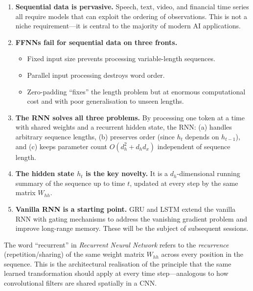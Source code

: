 \documentclass[12pt,a4paper]{article}
\newcommand{\Whh}{W_{hh}}
\begin{document}
\begin{enumerate}[leftmargin=2em,label=\textbf{\arabic*.}]
  \item \textbf{Sequential data is pervasive.} Speech, text, video, and
        financial time series all require models that can exploit the ordering
        of observations.  This is not a niche requirement---it is central to
        the majority of modern AI applications.

  \item \textbf{FFNNs fail for sequential data on three fronts.}
        \begin{itemize}[nosep]
          \item Fixed input size prevents processing variable-length sequences.
          \item Parallel input processing destroys word order.
          \item Zero-padding ``fixes'' the length problem but at enormous
                computational cost and with poor generalisation to unseen lengths.
        \end{itemize}

  \item \textbf{The RNN solves all three problems.}  By processing one token
        at a time with shared weights and a recurrent hidden state, the RNN:
        (a) handles arbitrary sequence lengths, (b) preserves order (since
        $h_t$ depends on $h_{t-1}$), and (c) keeps parameter count
        $O(d_h^2 + d_h d_x)$ independent of sequence length.

  \item \textbf{The hidden state $h_t$ is the key novelty.}  It is a
        $d_h$-dimensional running summary of the sequence up to time $t$,
        updated at every step by the same matrix $\Whh$.

  \item \textbf{Vanilla RNN is a starting point.}  GRU and LSTM extend the
        vanilla RNN with gating mechanisms to address the vanishing gradient
        problem and improve long-range memory.  These will be the subject of
        subsequent sessions.
\end{enumerate}

\begin{keyinsight}
The word ``recurrent'' in \emph{Recurrent Neural Network} refers to the
\emph{recurrence} (repetition/sharing) of the same weight matrix $\Whh$
across every position in the sequence.  This is the architectural realisation
of the principle that the same learned transformation should apply at every
time step---analogous to how convolutional filters are shared spatially in a
CNN.
\end{keyinsight}
\end{document}
